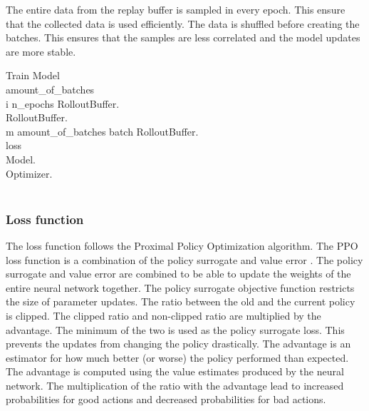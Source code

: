 The entire data from the replay buffer is sampled in every epoch. This ensure that the collected data is used efficiently. The data is shuffled before creating the batches. This ensures that the samples are less correlated and the model updates are more stable.

\renewcommand{\thepseudonum}{\roman{pseudonum}}
\begin{pseudocode}{Train Model}{ }
\\

amount\_of\_batches \GETS {}\\
\FOR i  \TO n\_epochs \DO
\BEGIN
RolloutBuffer.\\
RolloutBuffer.\\
\FOR m  \TO amount\_of\_batches \DO
\BEGIN
batch \GETS RolloutBuffer.\\
loss \GETS {}\\
Model.\\
Optimizer.\\
\END\\
\END
\ENDPROCEDURE

\end{pseudocode}

\subsubsection*{Loss function}

The loss function follows the Proximal Policy Optimization algorithm. The PPO loss function is a combination of the policy surrogate and value error \autocite{ppo}. The policy surrogate and value error are combined to be able to update the weights of the entire neural network together. 
The policy surrogate objective function restricts the size of parameter updates. The ratio between the old and the current policy is clipped. The clipped ratio and non-clipped ratio are multiplied by the advantage. The minimum of the two is used as the policy surrogate loss. This prevents the updates from changing the policy drastically.
The advantage is an estimator for how much better (or worse) the policy performed than expected. The advantage is computed using the value estimates produced by the neural network. The multiplication of the ratio with the advantage lead to increased probabilities for good actions and decreased probabilities for bad actions.

